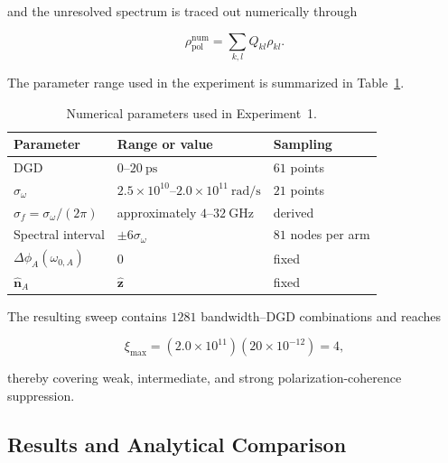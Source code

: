and the unresolved spectrum is traced out numerically through

\begin{equation}
\rho_{\mathrm{pol}}^{\mathrm{num}}
=
\sum_{k,l}
Q_{kl}\rho_{kl}.
\label{eq:experiment_1_numerical_spectral_trace}
\end{equation}

The parameter range used in the experiment is summarized in
Table~\ref{tab:experiment_1_parameters}.

\begin{table}[htbp]
    \centering
    \caption{Numerical parameters used in Experiment~1.}
    \label{tab:experiment_1_parameters}

    \begin{tabular}{lll}
        \hline
        Parameter & Range or value & Sampling \\
        \hline
        DGD
        & \(0\)--\(20~\mathrm{ps}\)
        & \(61\) points \\
        \(\sigma_\omega\)
        & \(2.5\times10^{10}\)--\(2.0\times10^{11}~\mathrm{rad/s}\)
        & \(21\) points \\
        \(\sigma_f=\sigma_\omega/(2\pi)\)
        & approximately \(4\)--\(32~\mathrm{GHz}\)
        & derived \\
        Spectral interval
        & \(\pm6\sigma_\omega\)
        & \(81\) nodes per arm \\
        \(\Delta\phi_A(\omega_{0,A})\)
        & \(0\)
        & fixed \\
        \(\hat{\mathbf n}_A\)
        & \(\hat{\mathbf z}\)
        & fixed \\
        \hline
    \end{tabular}
\end{table}

The resulting sweep contains \(1281\) bandwidth--DGD combinations and reaches

\[
\xi_{\max}
=
(2.0\times10^{11})
(20\times10^{-12})
=
4,
\]

thereby covering weak, intermediate, and strong polarization-coherence
suppression.


\subsection{Results and Analytical Comparison}
\label{subsec:experiment_1_results}

